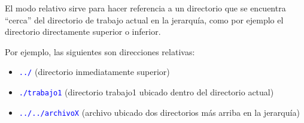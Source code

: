 \documentclass[12pt]{article}
\newcommand{\cw}[1]{\texttt{\textcolor{blue}{#1}}}
\begin{document}
El modo relativo sirve para hacer referencia a un directorio que se encuentra
``cerca'' del directorio de trabajo actual en la jerarquía, como por ejemplo
el directorio directamente superior o inferior.

Por ejemplo, las siguientes son direcciones relativas:

\vspace{-2\topsep}
\begin{itemize}

    \itemsep2pt \parskip0pt 

    \item \cw{../} (directorio inmediatamente superior)

    \item \cw{./trabajo1} (directorio trabajo1 ubicado dentro del directorio
        actual)

    \item \cw{../../archivoX} (archivo ubicado dos directorios más arriba en
        la jerarquía)

\end{itemize}
\end{document}
